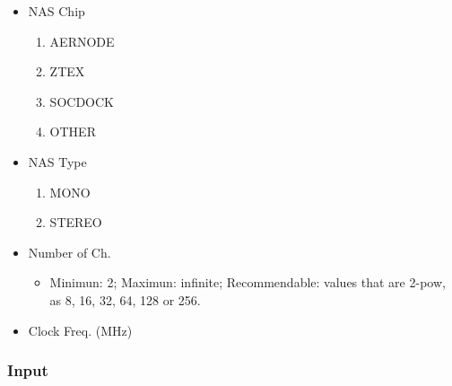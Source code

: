 \begin{itemize}
    \item NAS Chip
        \begin{enumerate}
            \item AERNODE
            \item ZTEX
            \item SOCDOCK
            \item OTHER
        \end{enumerate}
    \item NAS Type 
        \begin{enumerate}
            \item MONO
            \item STEREO
        \end{enumerate}
    \item Number of Ch.
        \begin{itemize}
            \item Minimun: 2; Maximun: infinite; Recommendable: values that are 2-pow, as 8, 16, 32, 64, 128 or 256.
        \end{itemize}
    \item Clock Freq. (MHz)
\end{itemize}

\subsubsection{Input}

